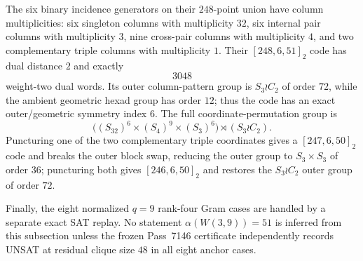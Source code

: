 The six binary incidence generators on their $248$-point union have column multiplicities: six singleton columns with multiplicity $32$, six internal pair columns with multiplicity $3$, nine cross-pair columns with multiplicity $4$, and two complementary triple columns with multiplicity $1$.  Their $[248,6,51]_2$ code has dual distance $2$ and exactly
\[
 \boxed{3048}
\]
weight-two dual words.  Its outer column-pattern group is $S_3\wr C_2$ of order $72$, while the ambient geometric hexad group has order $12$; thus the code has an exact outer/geometric symmetry index $6$.  The full coordinate-permutation group is
\[
 \bigl((S_{32})^6\times(S_4)^9\times(S_3)^6\bigr)\rtimes(S_3\wr C_2).
\]
Puncturing one of the two complementary triple coordinates gives a $[247,6,50]_2$ code and breaks the outer block swap, reducing the outer group to $S_3\times S_3$ of order $36$; puncturing both gives $[246,6,50]_2$ and restores the $S_3\wr C_2$ outer group of order $72$.

Finally, the eight normalized $q=9$ rank-four Gram cases are handled by a separate exact SAT replay.  No statement $\alpha(W(3,9))=51$ is inferred from this subsection unless the frozen Pass~7146 certificate independently records UNSAT at residual clique size $48$ in all eight anchor cases.

